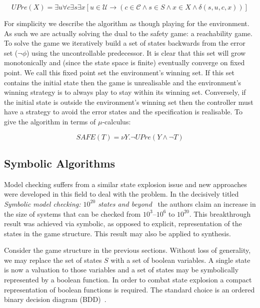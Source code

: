 $$UPre(X) = \exists u \forall c \exists s \exists x [u \in \mathcal{U} \to (c \in \mathcal{C} \land s \in S \land x \in X \land \delta(s, u, c, x))]$$

For simplicity we describe the algorithm as though playing for the environment. As such we are actually solving the dual to the safety game: a reachability game.  To solve the game we iteratively build a set of states backwards from the error set ($\lnot \phi$) using the uncontrollable predecessor. It is clear that this set will grow monotonically and (since the state space is finite) eventually converge on fixed point. We call this fixed point set the environment's winning set. If this set contains the initial state then the game is unrealisable and the environment's winning strategy is to always play to stay within its winning set. Conversely, if the initial state is outside the environment's winning set then the controller must have a strategy to avoid the error states and the specification is realisable. To give the algorithm in terms of $\mu$-calculus:

$$ SAFE(T) = \nu Y . \lnot UPre( Y \land \lnot T ) $$

\subsection{Symbolic Algorithms}

Model checking suffers from a similar state explosion issue and new approaches were developed in this field to deal with the problem.  In the decisively titled \emph{Symbolic model checking: $10^{20}$ states and beyond}~\cite{Burch90} the authors claim an increase in the size of systems that can be checked from $10^3$--$10^6$ to $10^{20}$. This breakthrough result was achieved via symbolic, as opposed to explicit, representation of the states in the game structure. This result may also be applied to synthesis.

Consider the game structure in the previous sections. Without loss of generality, we may replace the set of states $S$ with a set of boolean variables. A single state is now a valuation to those variables and a set of states may be symbolically represented by a boolean function. In order to combat state explosion a compact representation of boolean functions is required. The standard choice is an ordered binary decision diagram (BDD)~\cite{Bryant86}.

